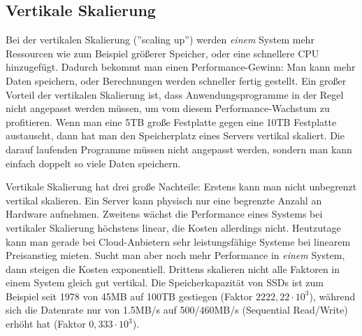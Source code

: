 \subsection{Vertikale Skalierung}
Bei der vertikalen Skalierung (''scaling up'') werden \textit{einem} System mehr Ressourcen wie zum Beispiel größerer Speicher, oder eine schnellere CPU hinzugefügt. Dadurch bekommt man einen Performance-Gewinn: Man kann mehr Daten speichern, oder Berechnungen werden schneller fertig gestellt.
Ein großer Vorteil der vertikalen Skalierung ist, dass Anwendungsprogramme in der Regel nicht angepasst werden müssen, um vom diesem Performance-Wachstum zu profitieren. Wenn man eine 5TB große Festplatte gegen eine 10TB Festplatte austauscht, dann hat man den Speicherplatz eines Servers vertikal skaliert. Die darauf laufenden Programme müssen nicht angepasst werden, sondern man kann einfach doppelt so viele Daten speichern.\cite{beaumont_how_2014}
\par
Vertikale Skalierung hat drei große Nachteile: Erstens kann man nicht unbegrenzt vertikal skalieren. Ein Server kann physisch nur eine begrenzte Anzahl an Hardware aufnehmen. Zweitens wächst die Performance eines Systems bei vertikaler Skalierung höchstens linear\cite{gustafson_amdahls_2011}, die Kosten allerdings nicht\cite{noauthor_horizontal_nodate}. Heutzutage kann man gerade bei Cloud-Anbietern sehr leistungsfähige Systeme bei linearem Preisanstieg mieten.\cite{noauthor_pricing_nodate} Sucht man aber noch mehr Performance in \textit{einem} System, dann steigen die Kosten exponentiell\cite{athow_at_2020}. Drittens skalieren nicht alle Faktoren in einem System gleich gut vertikal. Die Speicherkapazität von SSDs ist zum Beispiel seit 1978 von 45MB auf 100TB gestiegen (Faktor $2222,22 \cdot 10^{3}$), während sich die Datenrate nur von 1.5MB/s auf 500/460MB/s (Sequential Read/Write) erhöht hat (Faktor $0,333 \cdot 10^{3}$).\cite{athow_at_2020}\cite{noauthor_who_nodate}  

